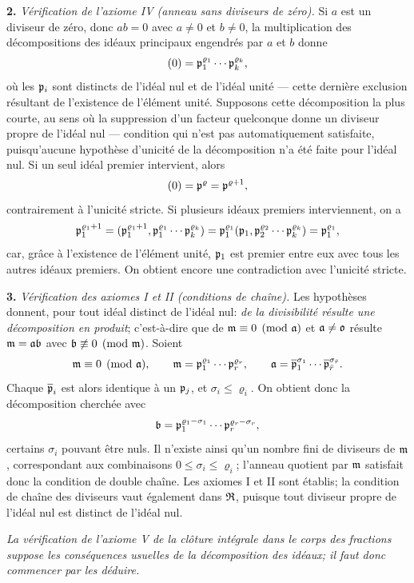 \textbf{2.} \emph{Vérification de l'axiome IV (anneau sans diviseurs de zéro).} Si $a$ est un diviseur de zéro, donc $ab=0$ avec $a\ne0$ et $b\ne0$, la multiplication des décompositions des idéaux principaux engendrés par $a$ et $b$ donne
\[
(0)=\mathfrak{p}_1^{\varrho_1}\cdots\mathfrak{p}_k^{\varrho_k},
\]
où les $\mathfrak{p}_i$ sont distincts de l'idéal nul et de l'idéal unité --- cette dernière exclusion résultant de l'existence de l'élément unité. Supposons cette décomposition la plus courte, au sens où la suppression d'un facteur quelconque donne un diviseur propre de l'idéal nul --- condition qui n'est pas automatiquement satisfaite, puisqu'aucune hypothèse d'unicité de la décomposition n'a été faite pour l'idéal nul. Si un seul idéal premier intervient, alors
\[
(0)=\mathfrak{p}^\varrho=\mathfrak{p}^{\varrho+1},
\]
contrairement à l'unicité stricte. Si plusieurs idéaux premiers interviennent, on a
\[
\mathfrak{p}_1^{\varrho_1+1}
=(\mathfrak{p}_1^{\varrho_1+1},
  \mathfrak{p}_1^{\varrho_1}\cdots\mathfrak{p}_k^{\varrho_k})
=\mathfrak{p}_1^{\varrho_1}
 (\mathfrak{p}_1,\mathfrak{p}_2^{\varrho_2}\cdots\mathfrak{p}_k^{\varrho_k})
=\mathfrak{p}_1^{\varrho_1},
\]
car, grâce à l'existence de l'élément unité, $\mathfrak{p}_1$ est premier entre eux avec tous les autres idéaux premiers. On obtient encore une contradiction avec l'unicité stricte.

\textbf{3.} \emph{Vérification des axiomes I et II (conditions de chaîne).} Les hypothèses donnent, pour tout idéal distinct de l'idéal nul: \emph{de la divisibilité résulte une décomposition en produit}; c'est-à-dire que de
$\mathfrak{m}\equiv0\pmod{\mathfrak{a}}$ et $\mathfrak{a}\ne\mathfrak{o}$ résulte
$\mathfrak{m}=\mathfrak{a}\mathfrak{b}$ avec $\mathfrak{b}\not\equiv0\pmod{\mathfrak{m}}$. Soient
\[
\mathfrak{m}\equiv0\pmod{\mathfrak{a}},\qquad
\mathfrak{m}=\mathfrak{p}_1^{\varrho_1}\cdots\mathfrak{p}_r^{\varrho_r},\qquad
\mathfrak{a}=\overline{\mathfrak{p}}_1^{\sigma_1}\cdots
    \overline{\mathfrak{p}}_{\bar r}^{\sigma_{\bar r}}.
\]
Chaque $\overline{\mathfrak{p}}_i$ est alors identique à un $\mathfrak{p}_j$, et
$\sigma_i\le\varrho_i$. On obtient donc la décomposition cherchée avec
\[
\mathfrak{b}=\mathfrak{p}_1^{\varrho_1-\sigma_1}\cdots
    \mathfrak{p}_r^{\varrho_r-\sigma_r},
\]
certains $\sigma_i$ pouvant être nuls. Il n'existe ainsi qu'un nombre fini de diviseurs de $\mathfrak{m}$, correspondant aux combinaisons
$0\le\sigma_i\le\varrho_i$; l'anneau quotient par $\mathfrak{m}$ satisfait donc la condition de double chaîne. Les axiomes I et II sont établis; la condition de chaîne des diviseurs vaut également dans $\mathfrak{R}$, puisque tout diviseur propre de l'idéal nul est distinct de l'idéal nul.

\emph{La vérification de l'axiome V de la clôture intégrale dans le corps des fractions suppose les conséquences usuelles de la décomposition des idéaux; il faut donc commencer par les déduire.}

